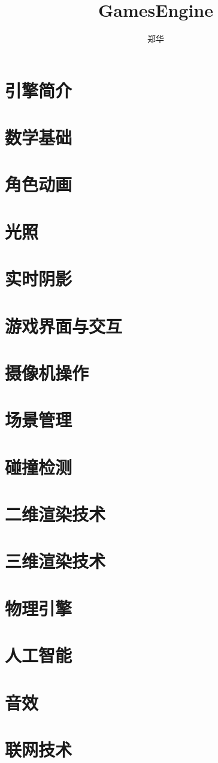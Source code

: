 \documentclass[UTF8,a4paper,8pt]{ctexart}
\author{郑华}
\title{GamesEngine}
\begin{document}
  \maketitle
\newpage

\section{引擎简介}


\newpage
\section{数学基础}


\newpage
\section{角色动画}


\newpage
\section{光照}


\newpage
\section{实时阴影}



\newpage
\section{游戏界面与交互}

\newpage
\section{摄像机操作}


\newpage
\section{场景管理}  


\newpage
\section{碰撞检测}


\newpage
\section{二维渲染技术}


\newpage
\section{三维渲染技术}


\newpage
\section{物理引擎}


\newpage
\section{人工智能}

\newpage
\section{音效}


\newpage
\section{联网技术}   
\end{document}
